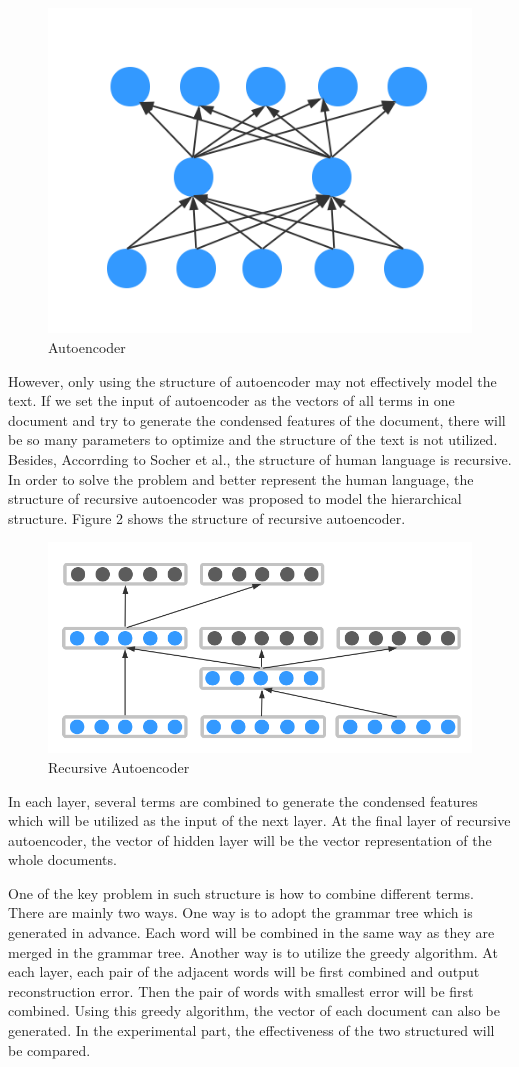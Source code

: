 \documentclass[dvips,9pt]{article}
\begin{document}
\begin{figure}[ht]
\centering
\includegraphics[width = 0.6\linewidth]{figure/autoencoder}
\caption{Autoencoder}
\label{fig:ae}
\end{figure}

However, only using the structure of autoencoder may not effectively model the text. If we set the input of autoencoder as the vectors of all terms in one document and try to generate the condensed features of the document, there will be so many parameters to optimize and the structure of the text is not utilized. Besides, Accorrding to Socher et al.\cite{socher2011parsing}, the structure of human language is recursive. In order to solve the problem and better represent the human language, the structure of recursive autoencoder was proposed to model the hierarchical structure. Figure 2 shows the structure of recursive autoencoder.
\begin{figure}[ht]
\centering
\includegraphics[width = 0.7\linewidth]{figure/recursiveautoencoder}
\caption{Recursive Autoencoder}
\label{fig:rae}
\end{figure}


In each layer, several terms are combined to generate the condensed features which will be utilized as the input of the next layer. At the final layer of recursive autoencoder, the vector of hidden layer will be the vector representation of the whole documents.

One of the key problem in such structure is how to combine different terms. There are mainly two ways. One way is to adopt the grammar tree which is generated in advance. Each word will be combined in the same way as they are merged in the grammar tree. Another way is to utilize the greedy algorithm. At each layer, each pair of the adjacent words will be first combined and output reconstruction error. Then the pair of words with smallest error will be first combined. Using this greedy algorithm, the vector of each document can also be generated. In the experimental part, the effectiveness of the two structured will be compared.
\end{document}
